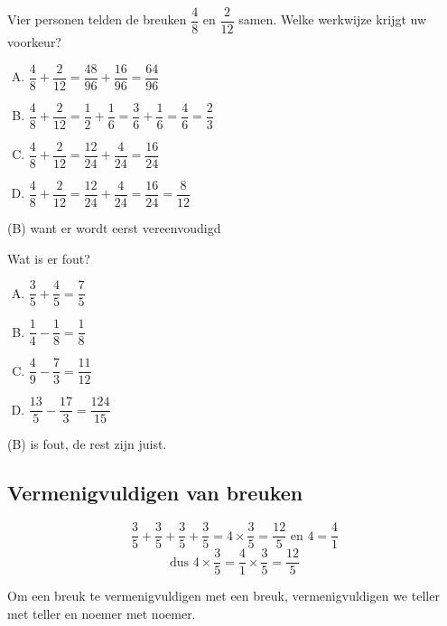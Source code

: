 \documentclass[12pt]{article}
\begin{document}
\begin{exercise}
Vier personen telden de breuken $\dfrac{4}{8}$ en $\dfrac{2}{12}$ samen. Welke werkwijze krijgt uw voorkeur?
\begin{enumerate}[(A)]
  \item $\dfrac{4}{8}+\dfrac{2}{12}=\dfrac{48}{96}+\dfrac{16}{96}=\dfrac{64}{96}$
  \item $\dfrac{4}{8}+\dfrac{2}{12}=\dfrac{1}{2}+\dfrac{1}{6}=\dfrac{3}{6}+\dfrac{1}{6}=\dfrac{4}{6}=\dfrac{2}{3}$
  \item $\dfrac{4}{8}+\dfrac{2}{12}=\dfrac{12}{24}+\dfrac{4}{24}=\dfrac{16}{24}$
  \item $\dfrac{4}{8}+\dfrac{2}{12}=\dfrac{12}{24}+\dfrac{4}{24}=\dfrac{16}{24}=\dfrac{8}{12}$
\end{enumerate}
\end{exercise}

\begin{solution}
(B) want er wordt eerst vereenvoudigd
\end{solution}

\begin{exercise}
Wat is er fout?
\begin{multicols}{2}
\begin{enumerate}[(A)]
  \item $\dfrac{3}{5}+\dfrac{4}{5}=\dfrac{7}{5}$
  \item $\dfrac{1}{4}-\dfrac{1}{8}=\dfrac{1}{8}$
  \item $\dfrac{4}{9}-\dfrac{7}{3}=\dfrac{11}{12}$
  \item $\dfrac{13}{5}-\dfrac{17}{3}=\dfrac{124}{15}$
\end{enumerate}
\end{multicols}
\end{exercise}

\begin{solution}
(B) is fout, de rest zijn juist.
\end{solution}

\subsection{Vermenigvuldigen van breuken}
$$\dfrac{3}{5}+\dfrac{3}{5}+\dfrac{3}{5}+\dfrac{3}{5}=4\times\dfrac{3}{5}=\dfrac{12}{5} \mbox{ en } 4=\dfrac{4}{1}$$
$$\mbox{dus } 4\times\dfrac{3}{5}=\dfrac{4}{1}\times\dfrac{3}{5}=\dfrac{12}{5}$$

\begin{onthoud}
Om een breuk te vermenigvuldigen met een breuk, vermenigvuldigen we teller met teller en noemer met noemer.
\end{onthoud}
\end{document}
